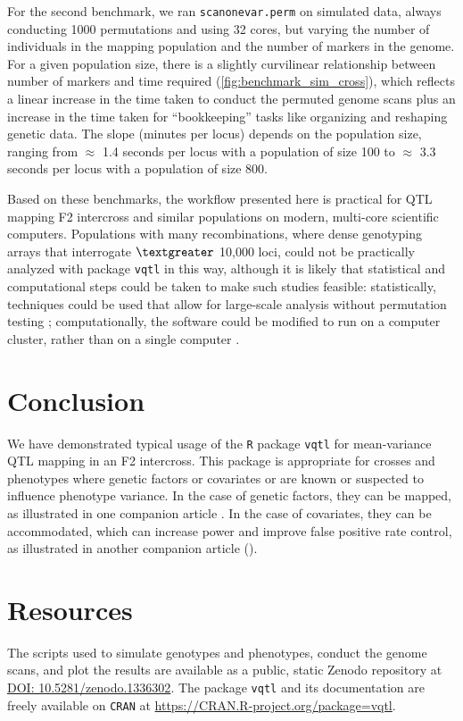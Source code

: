 \documentclass[9pt,twocolumn,twoside]{gsag3jnl}
\begin{document}
For the second benchmark, we ran \texttt{scanonevar.perm} on simulated data, always conducting 1000 permutations and using 32 cores, but varying the number of individuals in the mapping population and the number of markers in the genome.
For a given population size, there is a slightly curvilinear relationship between number of markers and time required (\autoref{fig:benchmark_sim_cross}), which reflects a linear increase in the time taken to conduct the permuted genome scans plus an increase in the time taken for ``bookkeeping'' tasks like organizing and reshaping genetic data.
The slope (minutes per locus) depends on the population size, ranging from $\approx$ 1.4 seconds per locus with a population of size 100 to $\approx$ 3.3 seconds per locus with a population of size 800.

Based on these benchmarks, the workflow presented here is practical for QTL mapping F2 intercross and similar populations on modern, multi-core scientific computers.
Populations with many recombinations, where dense genotyping arrays that interrogate $\textgreater$ 10,000 loci, could not be practically analyzed with package \texttt{vqtl} in this way, although it is likely that statistical and computational steps could be taken to make such studies feasible:
statistically, techniques could be used that allow for large-scale analysis without permutation testing \citep{Efron2004};
computationally, the software could be modified to run on a computer cluster, rather than on a single computer \citep{Jette2003,Marchand2017}.

\section*{Conclusion}

We have demonstrated typical usage of the \texttt{R} package \texttt{vqtl} for mean-variance QTL mapping in an F2 intercross.
This package is appropriate for crosses and phenotypes where genetic factors or covariates or are known or suspected to influence phenotype variance.
In the case of genetic factors, they can be mapped, as illustrated in one companion article \citep{Corty2018biorxiv}.
In the case of covariates, they can be accommodated, which can increase power and improve false positive rate control, as illustrated in another companion article (\citep{CortyValdar2018bvh-biorxiv}).

\section*{Resources}
The scripts used to simulate genotypes and phenotypes, conduct the genome scans, and plot the results are available as a public, static Zenodo repository at \url{DOI: 10.5281/zenodo.1336302}.
The package \texttt{vqtl} and its documentation are freely available on \texttt{CRAN} at \url{https://CRAN.R-project.org/package=vqtl}.
\end{document}
